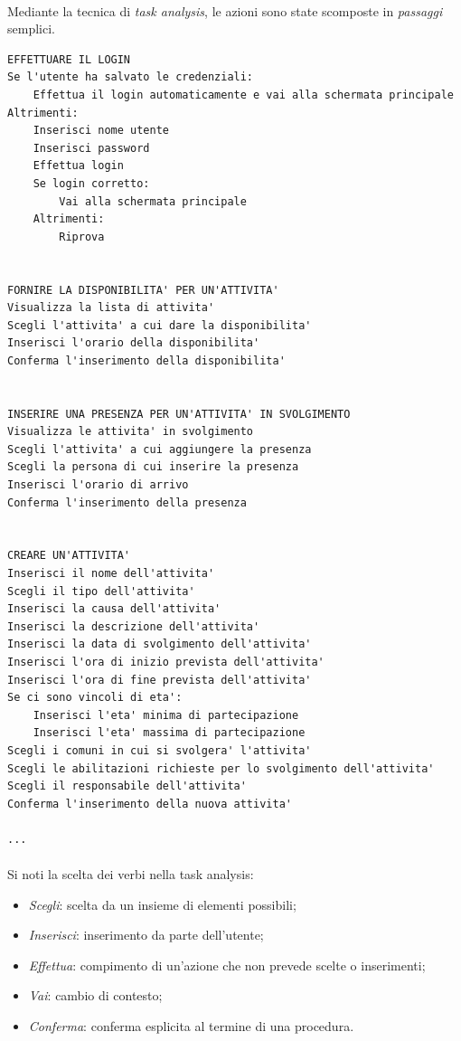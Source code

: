 \documentclass[11pt,a4paper,english]{article}
\begin{document}
\paragraph{} Mediante la tecnica di \emph{task analysis}, le azioni sono state scomposte in \emph{passaggi} semplici. 

\begin{lstlisting}[title=Task analysis]
EFFETTUARE IL LOGIN
Se l'utente ha salvato le credenziali: 
    Effettua il login automaticamente e vai alla schermata principale
Altrimenti:
    Inserisci nome utente 
    Inserisci password
    Effettua login
    Se login corretto:
        Vai alla schermata principale
    Altrimenti: 
        Riprova
        
        
FORNIRE LA DISPONIBILITA' PER UN'ATTIVITA'
Visualizza la lista di attivita'
Scegli l'attivita' a cui dare la disponibilita'
Inserisci l'orario della disponibilita'
Conferma l'inserimento della disponibilita'


INSERIRE UNA PRESENZA PER UN'ATTIVITA' IN SVOLGIMENTO
Visualizza le attivita' in svolgimento
Scegli l'attivita' a cui aggiungere la presenza
Scegli la persona di cui inserire la presenza
Inserisci l'orario di arrivo 
Conferma l'inserimento della presenza


CREARE UN'ATTIVITA'
Inserisci il nome dell'attivita'
Scegli il tipo dell'attivita'
Inserisci la causa dell'attivita'
Inserisci la descrizione dell'attivita'
Inserisci la data di svolgimento dell'attivita'
Inserisci l'ora di inizio prevista dell'attivita'
Inserisci l'ora di fine prevista dell'attivita'
Se ci sono vincoli di eta':
    Inserisci l'eta' minima di partecipazione
    Inserisci l'eta' massima di partecipazione
Scegli i comuni in cui si svolgera' l'attivita'
Scegli le abilitazioni richieste per lo svolgimento dell'attivita'
Scegli il responsabile dell'attivita'
Conferma l'inserimento della nuova attivita' 

...
\end{lstlisting}

\paragraph{} Si noti la scelta dei verbi nella task analysis:
\begin{itemize}
    \item \textit{Scegli}: scelta da un insieme di elementi possibili;
    \item \textit{Inserisci}: inserimento da parte dell'utente;
    \item \textit{Effettua}: compimento di un'azione che non prevede scelte o inserimenti;
    \item \textit{Vai}: cambio di contesto;
    \item \textit{Conferma}: conferma esplicita al termine di una procedura.
\end{itemize}
\end{document}
